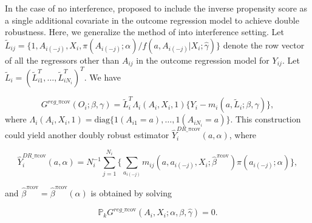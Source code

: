\documentclass[oupdraft]{bio}
\begin{document}
In the case of no interference, \citet{scharfstein1999adjusting} proposed to include the inverse propensity score as a single additional covariate in the outcome regression model to achieve double robustness. Here, we generalize the method of \citet{scharfstein1999adjusting} into interference setting. Let $\tilde L_{ij}=\{1,A_{i(-j)},X_i,\pi(A_{i(-j)};\alpha)/f(a, A_{i(-j)}|X_i;\hat\gamma)\}$ denote the row vector of all the regressors other than $A_{ij}$ in the outcome regression model for $Y_{ij}$. Let $\tilde L_i=(\tilde L_{i1}^T,\ldots,\tilde L_{iN_i}^T)^T$. We have

$$G^{reg\_\pi\text{cov}}(O_i;\beta,\gamma)=\tilde L_i^T\Lambda_i(A_i,X_i,1)\{Y_i- m_i(a,\tilde L_i;\beta,\gamma)\},$$ 
where  $\Lambda_i(A_i,X_i,1)=\text{diag}\biggl\{1(A_{i1}=a),\ldots,1(A_{iN_i}=a)\biggr\}$. This construction could yield another doubly robust estimator $\widehat{Y}_i^{DR\_\pi\text{cov}}(a,\alpha)$, where

\vspace{-0.8cm}
\begin{equation*}\label{eq: DR_picov_estimator}
  \widehat{Y}_i^{DR\_\pi\text{cov}}(a,\alpha)=N_i^{-1}\sum_{j=1}^{N_i}\Biggl\{\sum_{a_{i(-j)}}m_{ij}(a,a_{i(-j)},X_i;\hat\beta^{\pi\text{cov}})\pi(a_{i(-j)};\alpha)
 \Biggr\},
 \end{equation*}

\noindent and $\hat\beta^{\pi\text{cov}}=\hat\beta^{\pi\text{cov}}(\alpha)$ is obtained by solving 

\begin{equation}\label{eq: ee_DR_picov}
\mathds{P}_kG^{reg\_\pi\text{cov}}(A_i,X_i;\alpha,\beta,\hat\gamma)=0.
\end{equation}
\end{document}
